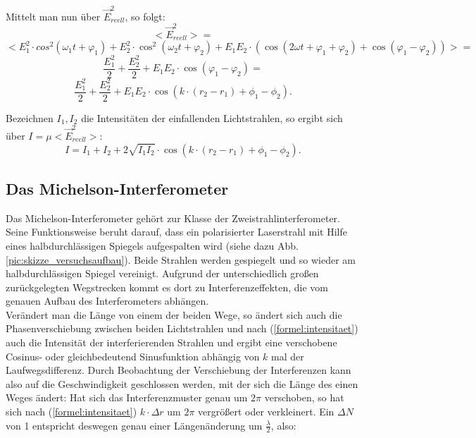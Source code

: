 Mittelt man nun über $  \vec{E}_{reell} ^{2} $, so folgt: 
\begin{equation}
\nonumber
<\vec{E}_{reell}^{2}> = 
\end{equation}
\begin{equation}
\nonumber
< E_{1}^{2} \cdot cos^{2}(\omega_{1}t + \varphi_{1}) + E_{2}^{2} \cdot \cos^{2}(\omega_{2}t + \varphi_{2}) + E_{1}E_{2} \cdot (\cos(2\omega t + \varphi_{1} + \varphi_{2}) + \cos(\varphi_{1} - \varphi_{2})) > = 
\end{equation}
\begin{equation}
\nonumber
\frac{E_{1}^{2}}{2} + \frac{E_{2}^{2}}{2} + E_{1}E_{2} \cdot \cos(\varphi_{1} - \varphi_{2}) = 
\end{equation}
\begin{equation}
\frac{E_{1}^{2}}{2} + \frac{E_{2}^{2}}{2} + E_{1}E_{2} \cdot \cos( k \cdot (r_{2} - r_{1}) + \phi_{1} - \phi_{2}).
\end{equation}

Bezeichnen $ I_{1}, I_{2} $ die Intensitäten der einfallenden Lichtstrahlen, so ergibt sich über $ I = \mu <\vec{E}_{reell}^{2}> $: 
\begin{equation}
\label{formel:intensitaet}
I = I_{1} + I_{2} + 2 \sqrt{I_{1} I_{2}} \cdot \cos( k \cdot (r_{2} - r_{1}) + \phi_{1} - \phi_{2}).
\end{equation}





\subsection{Das Michelson-Interferometer}

Das Michelson-Interferometer gehört zur Klasse der Zweistrahlinterferometer. Seine Funktionsweise beruht darauf, 
dass ein polarisierter Laserstrahl mit Hilfe eines halbdurchlässigen Spiegels aufgespalten wird (siehe dazu Abb.
\ref{pic:skizze_versuchsaufbau}). Beide Strahlen werden gespiegelt und so wieder am halbdurchlässigen Spiegel 
vereinigt. Aufgrund der unterschiedlich großen zurückgelegten Wegstrecken kommt es dort zu Interferenzeffekten,
die vom genauen Aufbau des Interferometers abhängen.\\
Verändert man die Länge von einem der beiden Wege, so ändert sich auch die Phasenverschiebung zwischen beiden 
Lichtstrahlen und nach (\ref{formel:intensitaet}) auch die Intensität der interferierenden Strahlen und ergibt eine verschobene 
Cosinus- oder gleichbedeutend Sinusfunktion abhängig von $ k $ mal der Laufwegsdifferenz. Durch Beobachtung der Verschiebung der Interferenzen kann also auf die Geschwindigkeit 
geschlossen werden, mit der sich die Länge des einen Weges ändert: 
Hat sich das Interferenzmuster genau um $ 2 \pi $ verschoben, so hat sich nach (\ref{formel:intensitaet}) $ k \cdot \Delta r $ um $ 2 \pi $ vergrößert oder verkleinert.
Ein $ \Delta N $ von 1 entspricht deswegen genau einer Längenänderung um $ \frac{\lambda}{2} $, also:


